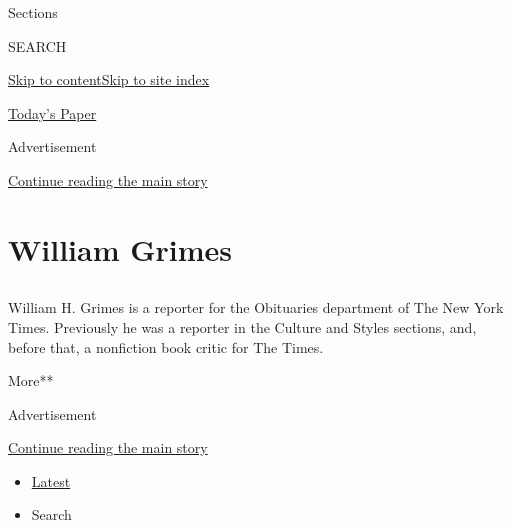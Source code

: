 Sections

SEARCH

\protect\hyperlink{site-content}{Skip to
content}\protect\hyperlink{site-index}{Skip to site index}

\href{https://myaccount.nytimes.com/auth/login?response_type=cookie\&client_id=vi}{}

\href{https://www.nytimes.com/section/todayspaper}{Today's Paper}

Advertisement

\protect\hyperlink{after-top}{Continue reading the main story}

\hypertarget{william-grimes}{%
\section{William Grimes}\label{william-grimes}}

\subsection{}

William H. Grimes is a reporter for the Obituaries department of The New
York Times. Previously he was a reporter in the Culture and Styles
sections, and, before that, a nonfiction book critic for The Times. ~

More**

Advertisement

\protect\hyperlink{after-mid1}{Continue reading the main story}

\begin{itemize}
\tightlist
\item
  \protect\hyperlink{stream-panel}{Latest}
\item
  Search
\end{itemize}

